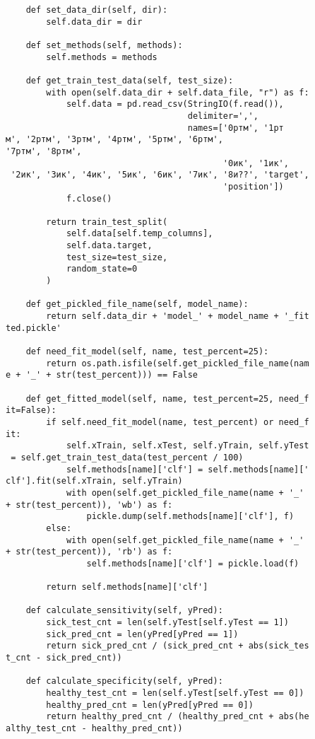 \begin{verbatim}
    def set_data_dir(self, dir):
        self.data_dir = dir

    def set_methods(self, methods):
        self.methods = methods

    def get_train_test_data(self, test_sizе):
        with open(self.data_dir + self.data_file, "r") as f:
            self.data = pd.read_csv(StringIO(f.read()),
                                    delimiter=',',
                                    names=['0ртм', '1рт
м', '2ртм', '3ртм', '4ртм', '5ртм', '6ртм', 
'7ртм', '8ртм',
                                           '0ик', '1ик',
 '2ик', '3ик', '4ик', '5ик', '6ик', '7ик', '8и??', 'target',
                                           'position'])
            f.close()

        return train_test_split(
            self.data[self.temp_columns],
            self.data.target,
            test_size=test_sizе,
            random_state=0
        )

    def get_pickled_file_name(self, model_name):
        return self.data_dir + 'model_' + model_name + '_fit
ted.pickle'

    def need_fit_model(self, name, test_percent=25):
        return os.path.isfile(self.get_pickled_file_name(nam
e + '_' + str(test_percent))) == False

    def get_fitted_model(self, name, test_percent=25, need_f
it=False):
        if self.need_fit_model(name, test_percent) or need_f
it:
            self.xTrain, self.xTest, self.yTrain, self.yTest
 = self.get_train_test_data(test_percent / 100)
            self.methods[name]['clf'] = self.methods[name]['
clf'].fit(self.xTrain, self.yTrain)
            with open(self.get_pickled_file_name(name + '_' 
+ str(test_percent)), 'wb') as f:
                pickle.dump(self.methods[name]['clf'], f)
        else:
            with open(self.get_pickled_file_name(name + '_' 
+ str(test_percent)), 'rb') as f:
                self.methods[name]['clf'] = pickle.load(f)

        return self.methods[name]['clf']

    def calculate_sensitivity(self, yPred):
        sick_test_cnt = len(self.yTest[self.yTest == 1])
        sick_pred_cnt = len(yPred[yPred == 1])
        return sick_pred_cnt / (sick_pred_cnt + abs(sick_tes
t_cnt - sick_pred_cnt))

    def calculate_specificity(self, yPred):
        healthy_test_cnt = len(self.yTest[self.yTest == 0])
        healthy_pred_cnt = len(yPred[yPred == 0])
        return healthy_pred_cnt / (healthy_pred_cnt + abs(he
althy_test_cnt - healthy_pred_cnt))


\end{verbatim}
